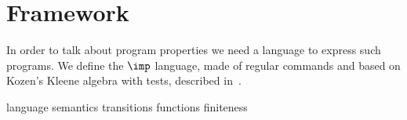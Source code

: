 \chapter{Framework}\label{ch:framework}


In order to talk about program properties we need a language to
express such programs. We define the \(\imp\) language, made of
regular commands and based on Kozen’s Kleene algebra with tests,
described in~\cite{kozen1997kleene}.  

{language}
{semantics}
{transitions}
{functions}
{finiteness}


